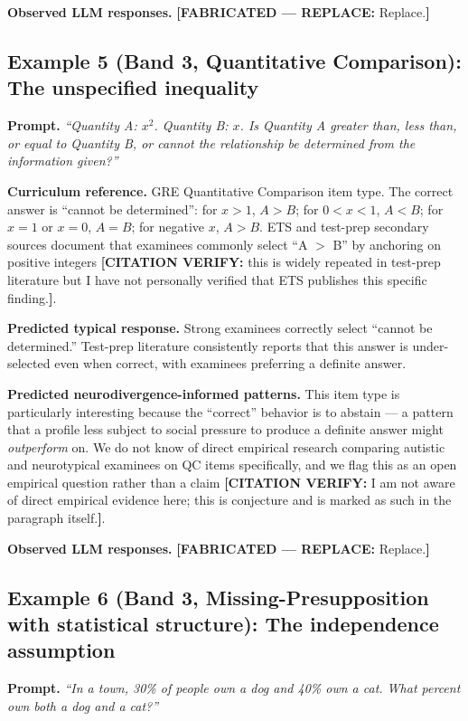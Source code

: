 \documentclass[11pt,letterpaper]{article}
\newcommand{\fabricated}[1]{{\color{red}\textbf{[FABRICATED --- REPLACE:} #1\textbf{]}}}
\newcommand{\citeverify}[1]{{\color{orange}\textbf{[CITATION VERIFY:} #1\textbf{]}}}
\begin{document}
\textbf{Observed LLM responses.} \fabricated{Replace.}

\subsection{Example 5 (Band 3, Quantitative Comparison): The unspecified inequality}

\textbf{Prompt.} \textit{``Quantity A: $x^2$. Quantity B: $x$. Is Quantity A greater than, less than, or equal to Quantity B, or cannot the relationship be determined from the information given?''}

\textbf{Curriculum reference.} GRE Quantitative Comparison item type. The correct answer is ``cannot be determined'': for $x > 1$, $A > B$; for $0 < x < 1$, $A < B$; for $x = 1$ or $x = 0$, $A = B$; for negative $x$, $A > B$. ETS and test-prep secondary sources document that examinees commonly select ``A $>$ B'' by anchoring on positive integers \citeverify{this is widely repeated in test-prep literature but I have not personally verified that ETS publishes this specific finding.}.

\textbf{Predicted typical response.} Strong examinees correctly select ``cannot be determined.'' Test-prep literature consistently reports that this answer is under-selected even when correct, with examinees preferring a definite answer.

\textbf{Predicted neurodivergence-informed patterns.} This item type is particularly interesting because the ``correct'' behavior is to abstain --- a pattern that a profile less subject to social pressure to produce a definite answer might \emph{outperform} on. We do not know of direct empirical research comparing autistic and neurotypical examinees on QC items specifically, and we flag this as an open empirical question rather than a claim \citeverify{I am not aware of direct empirical evidence here; this is conjecture and is marked as such in the paragraph itself.}.

\textbf{Observed LLM responses.} \fabricated{Replace.}

\subsection{Example 6 (Band 3, Missing-Presupposition with statistical structure): The independence assumption}

\textbf{Prompt.} \textit{``In a town, 30\% of people own a dog and 40\% own a cat. What percent own both a dog and a cat?''}
\end{document}
